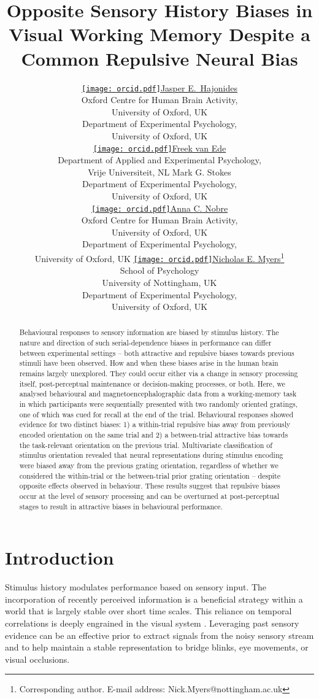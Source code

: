 \documentclass{article}
\title{Opposite Sensory History Biases in Visual Working Memory Despite a Common Repulsive Neural Bias}
\author{ \href{https://orcid.org/0000-0002-0812-6842}{\texttt{[image: orcid.pdf]}\hspace{1mm}Jasper  E.~Hajonides} \\
	Oxford Centre for Human Brain Activity, \\
	University of Oxford, UK\\
	Department of Experimental Psychology, \\
	University of Oxford, UK \\
	\And
	\href{https://orcid.org/0000-0002-7434-1751}{\texttt{[image: orcid.pdf]}\hspace{1mm}Freek van Ede} \\
	Department of Applied and Experimental Psychology,\\
	Vrije Universiteit, NL
	\AND
	Mark G. Stokes \\
	Department of Experimental Psychology, \\
	University of Oxford, UK \\
	\And
	\href{https://orcid.org/0000-0001-5762-2802}{\texttt{[image: orcid.pdf]}\hspace{1mm}Anna C. Nobre} \\
	Oxford Centre for Human Brain Activity, \\
	University of Oxford, UK\\
	Department of Experimental Psychology, \\
	University of Oxford, UK
	\And
	\href{https://orcid.org/0000-0001-5599-3044}{\texttt{[image: orcid.pdf]}\hspace{1mm}Nicholas E. Myers}\thanks{Corresponding author. E-mail address: Nick.Myers@nottingham.ac.uk} \\
	School of Psychology \\
	University of Nottingham, UK \\ 
	Department of Experimental Psychology, \\
	University of Oxford, UK
}
\begin{document}
\maketitle

\begin{abstract}
Behavioural responses to sensory information are biased by stimulus history. The nature and direction of such serial-dependence biases in performance can differ between experimental settings – both attractive and repulsive biases towards previous stimuli have been observed. How and when these biases arise in the human brain remains largely unexplored. They could occur either via a change in sensory processing itself, post-perceptual maintenance or decision-making processes, or both. Here, we analysed behavioural and magnetoencephalographic data from a working-memory task in which participants were sequentially presented with two randomly oriented gratings, one of which was cued for recall at the end of the trial. Behavioural responses showed evidence for two distinct biases: 1) a within-trial repulsive bias away from previously encoded orientation on the same trial and 2) a between-trial attractive bias towards the task-relevant orientation on the previous trial. Multivariate classification of stimulus orientation revealed that neural representations during stimulus encoding were biased away from the previous grating orientation, regardless of whether we considered the within-trial or the between-trial prior grating orientation – despite opposite effects observed in behaviour. These results suggest that repulsive biases occur at the level of sensory processing and can be overturned at post-perceptual stages to result in attractive biases in behavioural performance. 
\end{abstract}
%
%


\section{Introduction}
Stimulus history modulates performance based on sensory input. The incorporation of recently perceived information is a beneficial strategy within a world that is largely stable over short time scales. This reliance on temporal correlations is deeply engrained in the visual system \parencite{Singer1995}. Leveraging past sensory evidence can be an effective prior to extract signals from the noisy sensory stream and to help maintain a stable representation to bridge blinks, eye movements, or visual occlusions. 
\end{document}
